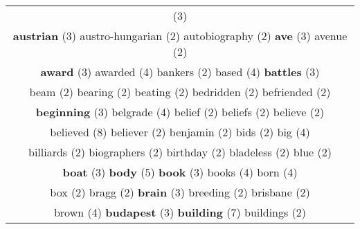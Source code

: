 \documentclass[12pt,a4paper]{article}
\begin{document}
\begin{center}
\begin{longtable}{|c|}
\footnotesize{(3)}  \\ {\small \textcolor{Laranja} {\bf austrian}} \footnotesize{(3)} {\footnotesize \textcolor{Verde} {austro-hungarian}} \footnotesize{(2)} {\footnotesize \textcolor{Verde} {autobiography}} \footnotesize{(2)} {\small \textcolor{Laranja} {\bf ave}} \footnotesize{(3)} {\footnotesize \textcolor{Verde} {avenue}} \footnotesize{(2)}  \\ {\small \textcolor{Laranja} {\bf award}} \footnotesize{(3)} {\normalsize \textcolor{VerdeLocao} {awarded}} \footnotesize{(4)} {\footnotesize \textcolor{Verde} {bankers}} \footnotesize{(2)} {\normalsize \textcolor{VerdeLocao} {based}} \footnotesize{(4)} {\small \textcolor{Laranja} {\bf battles}} \footnotesize{(3)}  \\ {\footnotesize \textcolor{Verde} {beam}} \footnotesize{(2)} {\footnotesize \textcolor{Verde} {bearing}} \footnotesize{(2)} {\footnotesize \textcolor{Verde} {beating}} \footnotesize{(2)} {\footnotesize \textcolor{Verde} {bedridden}} \footnotesize{(2)} {\footnotesize \textcolor{Verde} {befriended}} \footnotesize{(2)}  \\ {\small \textcolor{Laranja} {\bf beginning}} \footnotesize{(3)} {\normalsize \textcolor{VerdeLocao} {belgrade}} \footnotesize{(4)} {\footnotesize \textcolor{Verde} {belief}} \footnotesize{(2)} {\footnotesize \textcolor{Verde} {beliefs}} \footnotesize{(2)} {\footnotesize \textcolor{Verde} {believe}} \footnotesize{(2)}  \\ {\huge \textcolor{Amarelo} {believed}} \footnotesize{(8)} {\footnotesize \textcolor{Verde} {believer}} \footnotesize{(2)} {\footnotesize \textcolor{Verde} {benjamin}} \footnotesize{(2)} {\footnotesize \textcolor{Verde} {bids}} \footnotesize{(2)} {\normalsize \textcolor{VerdeLocao} {big}} \footnotesize{(4)}  \\ {\footnotesize \textcolor{Verde} {billiards}} \footnotesize{(2)} {\footnotesize \textcolor{Verde} {biographers}} \footnotesize{(2)} {\footnotesize \textcolor{Verde} {birthday}} \footnotesize{(2)} {\footnotesize \textcolor{Verde} {bladeless}} \footnotesize{(2)} {\footnotesize \textcolor{Verde} {blue}} \footnotesize{(2)}  \\ {\small \textcolor{Laranja} {\bf boat}} \footnotesize{(3)} {\large \textcolor{Roxo} {\bf body}} \footnotesize{(5)} {\small \textcolor{Laranja} {\bf book}} \footnotesize{(3)} {\normalsize \textcolor{VerdeLocao} {books}} \footnotesize{(4)} {\normalsize \textcolor{VerdeLocao} {born}} \footnotesize{(4)}  \\ {\footnotesize \textcolor{Verde} {box}} \footnotesize{(2)} {\footnotesize \textcolor{Verde} {bragg}} \footnotesize{(2)} {\small \textcolor{Laranja} {\bf brain}} \footnotesize{(3)} {\footnotesize \textcolor{Verde} {breeding}} \footnotesize{(2)} {\footnotesize \textcolor{Verde} {brisbane}} \footnotesize{(2)}  \\ {\normalsize \textcolor{VerdeLocao} {brown}} \footnotesize{(4)} {\small \textcolor{Laranja} {\bf budapest}} \footnotesize{(3)} {\LARGE \textcolor{Rosa} {\bf building}} \footnotesize{(7)} {\footnotesize \textcolor{Verde} {buildings}} \footnotesize{(2)} {\small \textcolor{Laranja} {\bf 
\end{longtable}
\end{center}
\end{document}

